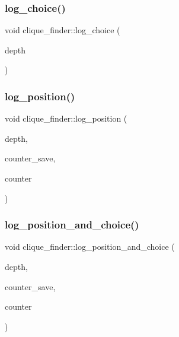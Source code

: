 \mbox{\label{classclique__finder_a56075f72456d19c09a041f8c1c1b9927}} 
\subsubsection{\texorpdfstring{log\+\_\+choice()}{log\_choice()}}
{\footnotesize\ttfamily void clique\+\_\+finder\+::log\+\_\+choice (\begin{DoxyParamCaption}\item[{\mbox{\hyperlink{galois_8h_a09fddde158a3a20bd2dcadb609de11dc}{I\+NT}}}]{depth }\end{DoxyParamCaption})}

\mbox{\label{classclique__finder_a6824d3ea2049ef742dccfec9733ed1ec}} 
\subsubsection{\texorpdfstring{log\+\_\+position()}{log\_position()}}
{\footnotesize\ttfamily void clique\+\_\+finder\+::log\+\_\+position (\begin{DoxyParamCaption}\item[{\mbox{\hyperlink{galois_8h_a09fddde158a3a20bd2dcadb609de11dc}{I\+NT}}}]{depth,  }\item[{\mbox{\hyperlink{galois_8h_a09fddde158a3a20bd2dcadb609de11dc}{I\+NT}}}]{counter\+\_\+save,  }\item[{\mbox{\hyperlink{galois_8h_a09fddde158a3a20bd2dcadb609de11dc}{I\+NT}}}]{counter }\end{DoxyParamCaption})}

\mbox{\label{classclique__finder_aa4b011fdcab17998ca2fdd181a8f760f}} 
\subsubsection{\texorpdfstring{log\+\_\+position\+\_\+and\+\_\+choice()}{log\_position\_and\_choice()}}
{\footnotesize\ttfamily void clique\+\_\+finder\+::log\+\_\+position\+\_\+and\+\_\+choice (\begin{DoxyParamCaption}\item[{\mbox{\hyperlink{galois_8h_a09fddde158a3a20bd2dcadb609de11dc}{I\+NT}}}]{depth,  }\item[{\mbox{\hyperlink{galois_8h_a09fddde158a3a20bd2dcadb609de11dc}{I\+NT}}}]{counter\+\_\+save,  }\item[{\mbox{\hyperlink{galois_8h_a09fddde158a3a20bd2dcadb609de11dc}{I\+NT}}}]{counter }\end{DoxyParamCaption})}

